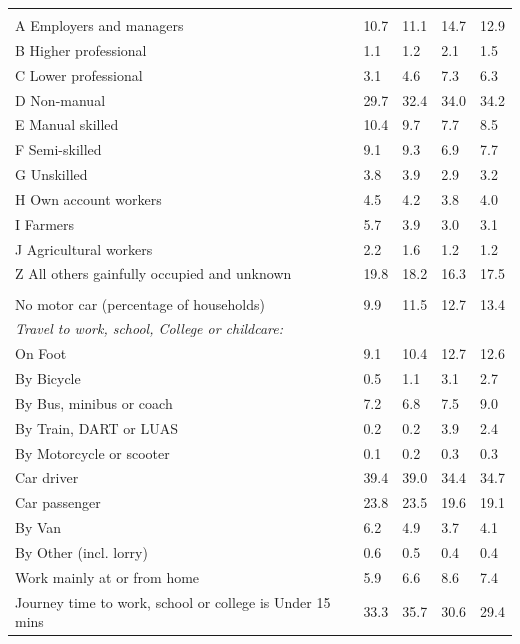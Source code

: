 \documentclass{article}
\begin{document}
\begin{table}[h]
\begin{tabular}{KTTTT}
\hline
    \\ 
    \hline
A Employers and managers & 10.7& 11.1& 14.7& 12.9\\
B Higher professional & 1.1& 1.2& 2.1& 1.5\\
C Lower professional & 3.1& 4.6& 7.3& 6.3\\
D Non-manual & 29.7& 32.4& 34.0& 34.2\\
E Manual skilled & 10.4&  9.7&  7.7&  8.5\\
F Semi-skilled & 9.1& 9.3& 6.9& 7.7\\
G Unskilled & 3.8& 3.9& 2.9& 3.2\\
H Own account workers & 4.5& 4.2& 3.8& 4.0\\
I Farmers & 5.7& 3.9& 3.0& 3.1\\
J Agricultural workers & 2.2& 1.6& 1.2& 1.2\\
Z All others gainfully occupied and unknown & 19.8& 18.2& 16.3& 17.5\\
\hline
{}\hline
    \\ 
    \hline
No motor car (percentage of households) &  9.9& 11.5& 12.7& 
13.4\\
    \hline 
\emph{Travel to work, school, College or childcare:} & & & \\
\quad On Foot &  9.1& 10.4& 12.7& 12.6\\ 
\quad By Bicycle & 0.5& 1.1& 3.1& 2.7\\ 
\quad By Bus, minibus or coach & 7.2& 6.8& 7.5& 9.0\\
\quad By Train, DART or LUAS & 0.2& 0.2& 3.9& 2.4\\
\quad By Motorcycle or scooter & 0.1& 0.2& 0.3& 0.3\\
\quad Car driver & 39.4 & 39.0& 34.4& 34.7\\
\quad Car passenger & 23.8& 23.5& 19.6& 19.1\\
\quad By Van & 6.2& 4.9& 3.7& 4.1\\
\quad By Other (incl. lorry) & 0.6& 0.5& 0.4& 0.4\\
    \hline
Work mainly at or from home & 5.9& 6.6& 8.6& 7.4\\
Journey time to work, school or college is Under 15 mins & 33.3& 35.7& 30.6& 29.4\\

\end{tabular}
\end{table}
\end{document}
